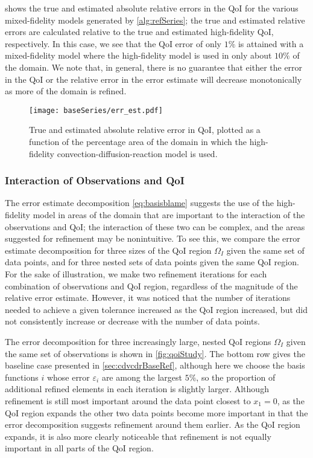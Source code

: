  shows the true and estimated absolute relative errors in the QoI for the various mixed-fidelity models generated by \cref{alg:refSeries}; the true and estimated relative errors are calculated relative to the true and estimated high-fidelity QoI, respectively. In this case, we see that the QoI error of only $1\%$ is attained with a mixed-fidelity model where the high-fidelity model is used in only about $10\%$ of the domain. We note that, in general, there is no guarantee that either the error in the QoI or the relative error in the error estimate will decrease monotonically as more of the domain is refined.
%
\begin{figure}[htbp]
\centering
\texttt{[image: baseSeries/err\_est.pdf]}
\caption{True and estimated absolute relative error in QoI, plotted as a function of the percentage area of the domain in which the high-fidelity convection-diffusion-reaction model is used. }
\label{fig:baseErr}
\end{figure}
%

\subsubsection{Interaction of Observations and QoI} \label{sec:qoivdata}
%
The error estimate decomposition \cref{eq:basisblame} suggests the use of the high-fidelity model in areas of the domain that are important to the interaction of the observations and QoI; the interaction of these two can be complex, and the areas suggested for refinement may be nonintuitive. To see this, we compare the error estimate decomposition for three sizes of the QoI region $\Omega_I$ given the same set of data points, and for three nested sets of data points given the same QoI region. For the sake of illustration, we make two refinement iterations for each combination of observations and QoI region, regardless of the magnitude of the relative error estimate. However, it was noticed that the number of iterations needed to achieve a given tolerance increased as the QoI region increased, but did not consistently increase or decrease with the number of data points.

The error decomposition for three increasingly large, nested QoI regions $\Omega_I$ given the same set of observations is shown in \cref{fig:qoiStudy}. The bottom row gives the baseline case presented in \cref{sec:cdvcdrBaseRef}, although here we choose the basis functions $i$ whose error $\varepsilon_i$ are among the largest $5\%$, so the proportion of additional refined elements in each iteration is slightly larger. Although refinement is still most important around the data point closest to $x_1=0$, as the QoI region expands the other two data points become more important in that the error decomposition suggests refinement around them earlier. As the QoI region expands, it is also more clearly noticeable that refinement is not equally important in all parts of the QoI region.

